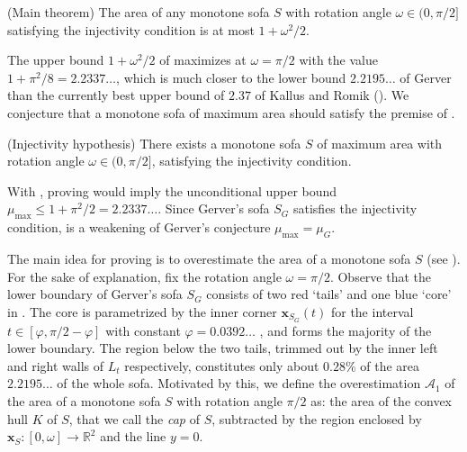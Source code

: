 \begin{theorem}

(Main theorem) The area of any monotone sofa \(S\) with rotation angle \(\omega \in (0, \pi/2]\) satisfying the injectivity condition is at most \(1 + \omega^2/2\).

\label{thm:main}
\end{theorem}

The upper bound \(1 + \omega^2/2\) of  maximizes at \(\omega = \pi/2\) with the value \(1 + \pi^2/8 = 2.2337\dots\), which is much closer to the lower bound \(2.2195\dots\) of Gerver than the currently best upper bound of \(2.37\) of Kallus and Romik (). We conjecture that a monotone sofa of maximum area should satisfy the premise of .

\begin{conjecture}

(Injectivity hypothesis) There exists a monotone sofa \(S\) of maximum area with rotation angle \(\omega \in (0, \pi/2]\), satisfying the injectivity condition.

\label{con:injectivity}
\end{conjecture}

With , proving  would imply the unconditional upper bound \(\mu_{\max} \leq 1 + \pi^2/2 = 2.2337\dots\). Since Gerver’s sofa \(S_G\) satisfies the injectivity condition,  is a weakening of Gerver’s conjecture \(\mu_{\max} = \mu_G\).

The main idea for proving  is to overestimate the area of a monotone sofa \(S\) (see ). For the sake of explanation, fix the rotation angle \(\omega = \pi/2\). Observe that the lower boundary of Gerver’s sofa \(S_G\) consists of two red ‘tails’ and one blue ‘core’ in . The core is parametrized by the inner corner \(\mathbf{x}_{S_G}(t)\) for the interval \(t \in [\varphi, \pi/2 - \varphi]\) with constant \(\varphi = 0.0392\dots\) \autocite{romikDifferentialEquationsExact2018}, and forms the majority of the lower boundary. The region below the two tails, trimmed out by the inner left and right walls of \(L_t\) respectively, constitutes only about \(0.28 \%\) of the area \(2.2195\dots\) of the whole sofa. Motivated by this, we define the overestimation \(\mathcal{A}_1\) of the area of a monotone sofa \(S\) with rotation angle \(\pi/2\) as: the area of the convex hull \(K\) of \(S\), that we call the \emph{cap} of \(S\), subtracted by the region enclosed by \(\mathbf{x}_S : [0, \omega] \to \mathbb{R}^2\) and the line \(y=0\).


